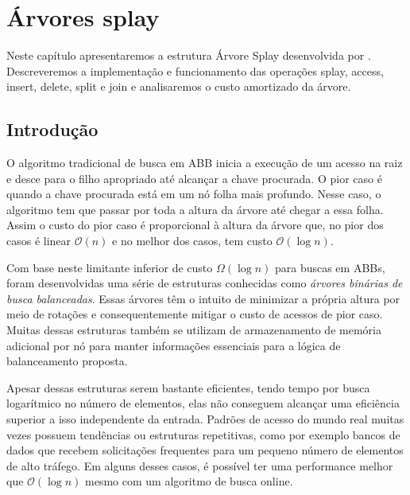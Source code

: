 
\chapter{Árvores splay}
\label{cap:arvores-splay}

Neste capítulo apresentaremos a estrutura Árvore Splay desenvolvida por \cite{selfadjustingbst}. Descreveremos a implementação e funcionamento das operações splay, access, insert, delete, split e join e analisaremos o custo amortizado da árvore.


\section{Introdução}
O algoritmo tradicional de busca em ABB inicia a execução de um acesso na raiz e desce para o filho apropriado até alcançar a chave procurada. O pior caso é quando a chave procurada está em um nó folha mais profundo. Nesse caso, o algoritmo tem que passar por toda a altura da árvore até chegar a essa folha. Assim o custo do pior caso é proporcional à altura da árvore que, no pior dos casos é linear $\mathcal{O}(n)$ e no melhor dos casos, tem custo $\mathcal{O}(\log{}n)$.

Com base neste limitante inferior de custo $\Omega(\log{}n)$ para buscas em ABBs, foram desenvolvidas uma série de estruturas conhecidas como \textit{árvores binárias de busca balanceadas}. Essas árvores têm o intuito de minimizar a própria altura por meio de rotações e consequentemente mitigar o custo de acessos de pior caso. Muitas dessas estruturas também se utilizam de armazenamento de memória adicional por nó para manter informações essenciais para a lógica de balanceamento proposta. 

Apesar dessas estruturas serem bastante eficientes, tendo tempo por busca logarítmico no número de elementos, elas não conseguem alcançar uma eficiência superior a isso independente da entrada. Padrões de acesso do mundo real muitas vezes possuem tendências ou estruturas repetitivas, como por exemplo bancos de dados que recebem solicitações frequentes para um pequeno número de elementos de alto tráfego. Em alguns desses casos, é possível ter uma performance melhor que $\mathcal{O}(\log{}n)$ mesmo com um algoritmo de busca online.

